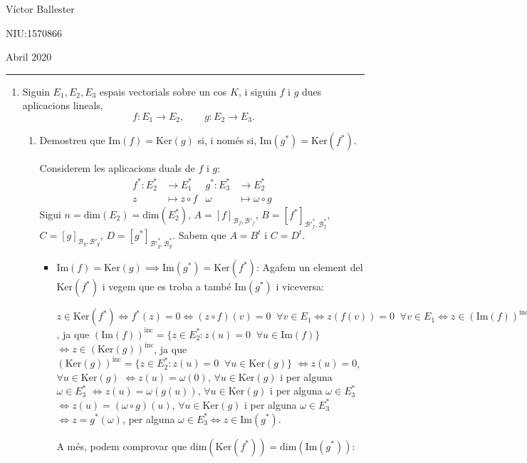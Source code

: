 \documentclass[11pt,a4paper]{article}
\begin{document}
\begin{flushright}
    Víctor Ballester\par NIU:1570866\par Abril 2020
\end{flushright}
\rule{180mm}{0.1mm}\par
\begin{enumerate}
    \item Siguin $E_1,E_2,E_3$ espais vectorials sobre un cos $K$, i siguin $f$ i $g$ dues aplicacions lineals, $$f:E_1\longrightarrow E_2,\qquad g:E_2\longrightarrow E_3.$$
    \begin{enumerate}
        \item Demostreu que $\text{Im}(f)=\text{Ker}(g)$ si, i només si, $\text{Im}(g^*)=\text{Ker}(f^*)$.\par
        Considerem les aplicacions duals de $f$ i $g$:
        \begin{align*}
            f^*:E_2^*&\longrightarrow E_1^*& g^*:E_3^*&\longrightarrow E_2^*\\
            z&\longmapsto z\circ f& \omega&\longmapsto\omega\circ g
        \end{align*}
        Sigui $n=\text{dim}(E_2)=\text{dim}(E_2^*)$, $A=[f]_{\mathcal{B}_f,\mathcal{B'}_f}$, $B=[f^*]_{\mathcal{B'}_f^*,\mathcal{B}_f^*}$, $C=[g]_{\mathcal{B}_g,\mathcal{B'}_g}$, $D=[g^*]_{\mathcal{B'}_g^*,\mathcal{B}_g^*}$. Sabem que $A=B^t$ i $C=D^t$.
        \begin{itemize}
            \item $\text{Im}(f)=\text{Ker}(g)\implies\text{Im}(g^*)=\text{Ker}(f^*)$: Agafem un element del $\text{Ker}(f^*)$ i vegem que es troba a també $\text{Im}(g^*)$ i viceversa:\par
            $z\in \text{Ker}(f^*)\iff f^*(z)=0\iff(z\circ f)(v)=0\;\;\forall v\in E_1\iff z(f(v))=0\;\;\forall v\in E_1\iff z\in (\text{Im}(f))^{\text{inc}}$, ja que $(\text{Im}(f))^{\text{inc}}=\{z\in E_2^*:z(u)=0\;\;\forall u\in\text{Im}(f)\}$ $\iff z\in (\text{Ker}(g))^{\text{inc}}$, ja que $(\text{Ker}(g))^{\text{inc}}=\{z\in E_2^*:z(u)=0\;\;\forall u\in\text{Ker}(g)\}$ $\iff z(u)=0$, $\forall u\in\text{Ker}(g)$ $\iff z(u)=\omega(0)$, $\forall u\in\text{Ker}(g)$ i per alguna $\omega\in E_3^*$ $\iff z(u)=\omega(g(u))$, $\forall u\in\text{Ker}(g)$ i per alguna $\omega\in E_3^*$ $\iff z(u)=(\omega\circ g)(u)$, $\forall u\in\text{Ker}(g)$ i per alguna $\omega\in E_3^*$ $\iff z=g^*(\omega)$, per alguna $\omega\in E_3^*\iff z\in\text{Im}(g^*)$.\par A més, podem comprovar que $\text{dim}(\text{Ker}(f^*))=\text{dim}(\text{Im}(g^*))$:

\end{itemize}
\end{enumerate}
\end{enumerate}
\end{document}
